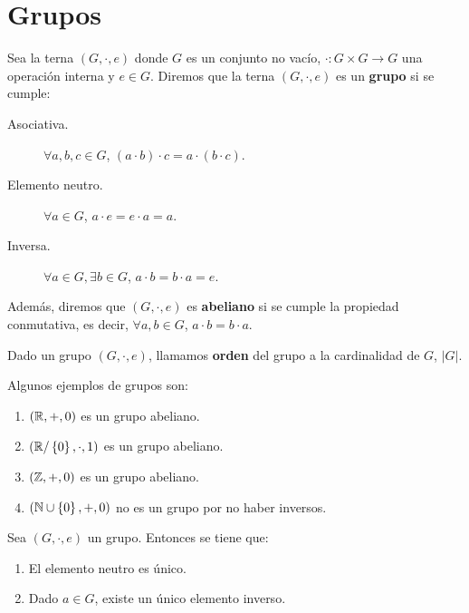 \chapter{Grupos}
\begin{definition}[Grupo]
Sea la terna $\displaystyle \left(G, \cdot, e\right) $ donde $\displaystyle G $ es un conjunto no vacío, $\displaystyle \cdot : G \times G \to G $ una operación interna y $\displaystyle e \in G $. Diremos que la terna $\displaystyle \left(G, \cdot , e\right) $ es un \textbf{grupo} si se cumple:
\begin{description}
\item[Asociativa.] $\displaystyle \forall a, b, c \in G $, $\displaystyle \left(a \cdot b\right) \cdot c = a \cdot \left(b \cdot c\right) $.
\item[Elemento neutro.] $\displaystyle \forall a \in G $, $\displaystyle a \cdot e = e \cdot a = a $.
\item[Inversa.] $\displaystyle \forall a \in G, \exists b \in G $, $\displaystyle a \cdot b = b \cdot a = e $.
\end{description}
Además, diremos que $\displaystyle \left(G, \cdot, e\right) $ es \textbf{abeliano} si se cumple la propiedad conmutativa, es decir, $\displaystyle \forall a,b \in G $, $\displaystyle a \cdot b = b \cdot a $.
\end{definition}
\begin{definition}
Dado un grupo $\displaystyle \left(G, \cdot, e\right) $, llamamos \textbf{orden} del grupo a la cardinalidad de $\displaystyle G $, $\displaystyle \left|G\right| $.
\end{definition}
\begin{eg}
Algunos ejemplos de grupos son:
\begin{enumerate}
\item $\displaystyle \left(\mathbb{R}, +, 0\right) $ es un grupo abeliano.
\item $\displaystyle \left(\mathbb{R} / \left\{ 0\right\} , \cdot, 1\right) $ es un grupo abeliano.
\item $\displaystyle \left(\mathbb{Z}, +, 0\right) $ es un grupo abeliano. 
\item $\displaystyle \left(\mathbb{N} \cup \left\{ 0\right\} , + , 0\right) $ no es un grupo por no haber inversos.
\end{enumerate}
\end{eg}
\begin{prop}
Sea $\displaystyle \left(G, \cdot, e\right) $ un grupo. Entonces se tiene que:
\begin{enumerate}
\item El elemento neutro es único.
\item Dado $\displaystyle a \in G $, existe un único elemento inverso.
\end{enumerate}
\end{prop}
